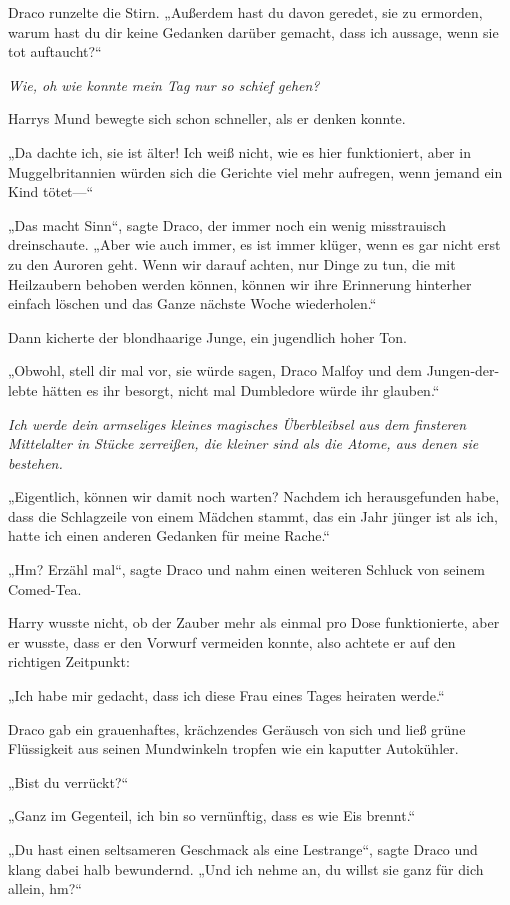 {Draco runzelte die Stirn. „Außerdem hast du davon geredet, sie zu ermorden, warum hast du dir keine Gedanken darüber gemacht, dass ich aussage, wenn sie tot auftaucht?“

\emph{Wie, oh wie konnte mein Tag nur so schief gehen?}

Harrys Mund bewegte sich schon schneller, als er denken konnte.

„Da dachte ich, sie ist älter! Ich weiß nicht, wie es hier funktioniert, aber in Muggelbritannien würden sich die Gerichte viel mehr aufregen, wenn jemand ein Kind tötet—“

„Das macht Sinn“, sagte Draco, der immer noch ein wenig misstrauisch dreinschaute. „Aber wie auch immer, es ist immer klüger, wenn es gar nicht erst zu den Auroren geht. Wenn wir darauf achten, nur Dinge zu tun, die mit Heilzaubern behoben werden können, können wir ihre Erinnerung hinterher einfach löschen und das Ganze nächste Woche wiederholen.“

Dann kicherte der blondhaarige Junge, ein jugendlich hoher Ton.

„Obwohl, stell dir mal vor, sie würde sagen, Draco Malfoy und dem Jungen-der-lebte hätten es ihr besorgt, nicht mal Dumbledore würde ihr glauben.“

\emph{Ich werde dein armseliges kleines magisches Überbleibsel aus dem finsteren Mittelalter in Stücke zerreißen, die kleiner sind als die Atome, aus denen sie bestehen.}

„Eigentlich, können wir damit noch warten? Nachdem ich herausgefunden habe, dass die Schlagzeile von einem Mädchen stammt, das ein Jahr jünger ist als ich, hatte ich einen anderen Gedanken für meine Rache.“

„Hm? Erzähl mal“, sagte Draco und nahm einen weiteren Schluck von seinem Comed-Tea.

Harry wusste nicht, ob der Zauber mehr als einmal pro Dose funktionierte, aber er wusste, dass er den Vorwurf vermeiden konnte, also achtete er auf den richtigen Zeitpunkt:

„Ich habe mir gedacht, dass ich diese Frau eines Tages heiraten werde.“

Draco gab ein grauenhaftes, krächzendes Geräusch von sich und ließ grüne Flüssigkeit aus seinen Mundwinkeln tropfen wie ein kaputter Autokühler.

„Bist du verrückt?“

„Ganz im Gegenteil, ich bin so vernünftig, dass es wie Eis brennt.“

„Du hast einen seltsameren Geschmack als eine Lestrange“, sagte Draco und klang dabei halb bewundernd. „Und ich nehme an, du willst sie ganz für dich allein, hm?“

}
